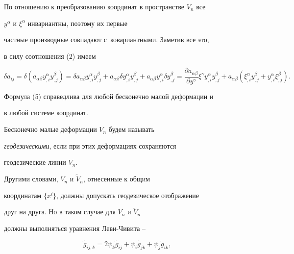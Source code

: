 По отношению к преобразованию координат в пространстве $V_n$ все


$y^\alpha$ и $\xi^\alpha $ инвариантны, поэтому их первые


частные производные совпадают с~ковариантными. Заметив все это,


в силу соотношения (2) имеем


\begin{equation}


\delta a_{ij}=


\delta (a_{\alpha \beta }y_{,i}^\alpha y_{,j}^\beta )=


\delta a_{\alpha \beta }y_{,i}^\alpha y_{,j}^\beta +


a_{\alpha \beta }\delta y_{,i}^\alpha y_{,j}^\beta +


a_{\alpha \beta }y_{,i}^\alpha \delta y_{,j}^\beta =


\frac{\partial a_{\alpha \beta }}{\partial y^\gamma }\xi^\gamma


y_{,i}^\alpha y_{,j}^\beta +a_{\alpha \beta }(\xi_{,i}^\alpha y_{,j}^\beta


+y_{,i}^\alpha \xi_{,j}^\beta ).


\end{equation}


Формула (5) справедлива для любой бесконечно малой деформации и


в любой системе координат.





\begin{defnnonum}


Бесконечно малые деформации $V_n$ будем называть 


{\it геодезическими}, если при этих деформациях сохраняются


геодезические линии $V_n$.


\end{defnnonum}





Другими словами, $V_n$ и $\widetilde{V}_n$, отнесенные к общим


координатам $\{x^i\}$, должны допускать геодезическое отображение


друг на друга. Но в таком случае для $V_n$ и $\widetilde{V}_n$


должны выполняться уравнения Леви-Чивита \cite{le}--\cite{ramiga}


\begin{equation}


\widetilde{g}_{ij,k}=2\psi_k\widetilde{g}_{ij}+\psi_i\widetilde{g}


_{jk}+\psi_j\widetilde{g}_{ik},


\end{equation}


